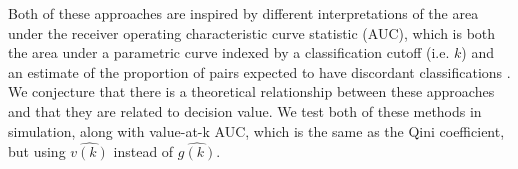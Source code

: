 Both of these approaches are inspired by different interpretations of the area under the receiver operating characteristic curve statistic (AUC), which is both the area under a parametric curve indexed by a classification cutoff (i.e. $k$) and an estimate of the proportion of pairs expected to have discordant classifications \cite{Hanley:1982cz}. We conjecture that there is a theoretical relationship between these approaches and that they are related to decision value. We test both of these methods in simulation, along with value-at-k AUC, which is the same as the Qini coefficient, but using $\hat{v(k)}$ instead of $\hat{g(k)}$.


\begin{comment}

Recall that the decision policy can be parametrized with a cutoff $k$: $\hat d(x,k) = I(\hat\tau>k)$. We can therefore also calculate the gain at $k$, $\hat g(k)$, which is the gain obtained when individuals with an estimated treatment effect greater than $k$ are treated. Researchers in direct marketing often rely on \emph{uplift curves} (also called gain curves or cumulative gain charts) \ to aid in model selection. The uplift curve plots gain at $k$:

\[
	\hat g(k)  =  \sum_{\mathcal{V}} \dfrac{y_i  \hat d(x_i,k) (2w_i-1)}{p_{w_i}(x_i)} 
\]




Researchers either evaluate these curves heuristically, take the maximum value over $k$, or calculate the \emph{Qini coefficient}, which is the area under the uplift curve \cite{Gutierrez:2016tq}. Given the relationship between gain and value, maximizing these metrics is equivalent to maximizing the equivalent value-based metric. 

\subsubsection{The concordance-for-benefit statistic}

\citet{vanKlaveren:2018gg} propose the concordance-for-benefit statistic to select among treatment effect models. Briefly, each individual $i$ in the test set is matched without replacement according to estimated treatment effect with another individual in the test set $\bar{i}$ ($\hat\tau(x_i) \approx \hat\tau(x_{\bar i})$) with the opposite treatment $w_i \ne w_{\bar i}$. The total number of pairs is $J$. For each pair of matched patients $j$, the difference in outcomes between the treated and untreated individuals is recorded: $\delta_j = (2w_i - 1)(y_i -y_{\bar i})$, along with the predicted treatment effect for both patients $t_j = \hat\tau(x_i)$. The concordance-for-benefit (or c-for-benefit) statistic is


\end{comment}
